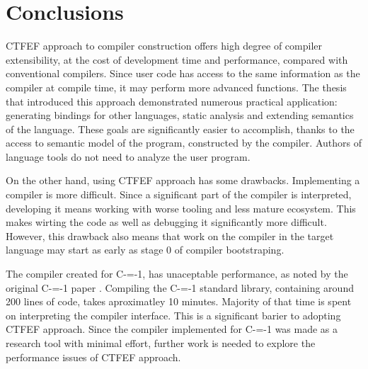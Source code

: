 \section{Conclusions}

CTFEF approach to compiler construction offers high degree of compiler extensibility, at the cost of development time and performance, compared with conventional compilers.
Since user code has access to the same information as the compiler at compile time, it may perform more advanced functions.
The thesis that introduced this approach \cite{grabski2020} demonstrated numerous practical application: generating bindings for other languages, static analysis and extending semantics of the language.
These goals are significantly easier to accomplish, thanks to the access to semantic model of the program, constructed by the compiler.
Authors of language tools do not need to analyze the user program.

On the other hand, using CTFEF approach has some drawbacks. Implementing a compiler is more difficult.
Since a significant part of the compiler is interpreted, developing it means working with worse tooling and less mature ecosystem.
This makes wirting the code as well as debugging it significantly more difficult.
However, this drawback also means that work on the compiler in the target language may start as early as stage 0 of compiler bootstraping\cite{puntambekar:compiler_design, novillo2007gcc}.

The compiler created for C-=-1, has unaceptable performance, as noted by the original C-=-1 paper \cite{grabski2022compilation}.
Compiling the C-=-1 standard library, containing around 200 lines of code, takes aproximatley 10 minutes.
Majority of that time is spent on interpreting the compiler interface.
This is a significant barier to adopting CTFEF approach.
Since the compiler implemented for C-=-1 was made as a research tool with minimal effort, further work is needed to explore the performance issues of CTFEF approach.
